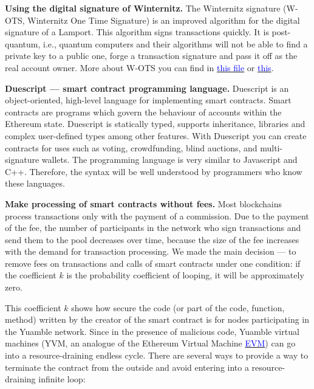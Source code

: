 \documentclass[11pt]{article}
\begin{document}
\begin{multicols}{2}
\vspace{1\baselineskip}
\textbf{Using the digital signature of Winternitz.}
The Winternitz signature (W-OTS, Winternitz One Time Signature) is an improved algorithm for the digital signature of a Lamport. This algorithm signs transactions quickly. It is post-quantum, i.e., quantum computers and their algorithms will not be able to find a private key to a public one, forge a transaction signature and pass it off as the real account owner. More about W-OTS you can find in \href{https://eprint.iacr.org/2011/191.pdf}{\textcolor{blue}{this file}} or \href{https://huelsing.net/wordpress/wp-content/uploads/2013/05/wotsspr.pdf}{\textcolor{blue}{this}}.

\vspace{1\baselineskip}
\textbf{Duescript — smart contract programming language.}
Duescript is an object-oriented, high-level language for implementing smart contracts. Smart contracts are programs which govern the behaviour of accounts within the Ethereum state. Duescript is statically typed, supports inheritance, libraries and complex user-defined types among other features. With Duescript you can create contracts for uses such as voting, crowdfunding, blind auctions, and multi-signature wallets. The programming language is very similar to Javascript and C++. Therefore, the syntax will be well understood by programmers who know these languages.

\vspace{1\baselineskip}
\textbf{Make processing of smart contracts without fees.}
Most blockchains process transactions only with the payment of a commission. Due to the payment of the fee, the number of participants in the network who sign transactions and send them to the pool decreases over time, because the size of the fee increases with the demand for transaction processing. We made the main decision — to remove fees on transactions and calls of smart contracts under one condition: if the coefficient $k$ is the probability coefficient of looping, it will be approximately zero.

This coefficient $k$ shows how secure the code (or part of the code, function, method) written by the creator of the smart contract is for nodes participating in the Yuamble network. Since in the presence of malicious code, Yuamble virtual machines (YVM, an analogue of the Ethereum Virtual Machine \href{https://ethereum.org/en/developers/docs/evm/}{\textcolor{blue}{EVM}}) can go into a resource-draining endless cycle.  There are several ways to provide a way to terminate the contract from the outside and avoid entering into a resource-draining infinite loop:


\end{multicols}
\end{document}

